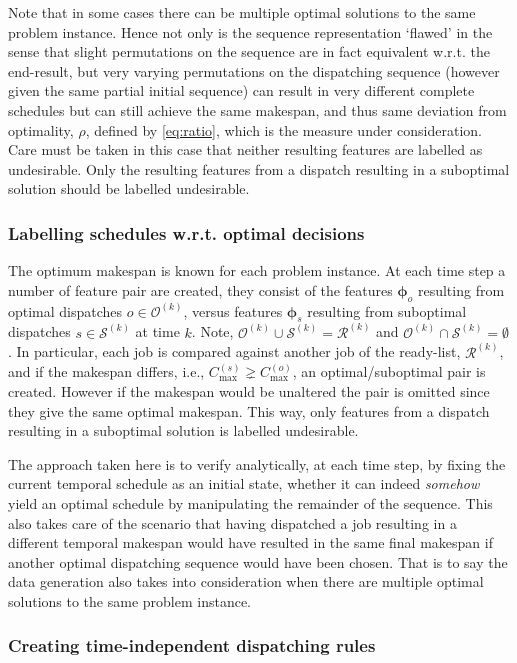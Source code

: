 \documentclass[smallextended]{svjour3}
\renewcommand{\vphi}{\bm \phi}
\begin{document}
	Note that in some cases there can be multiple optimal solutions to the same problem instance. Hence not only is the sequence representation `flawed' in the sense that slight permutations on the sequence are in fact equivalent w.r.t. the end-result, but very varying permutations on the dispatching sequence (however given the same partial initial sequence) can result in very different complete schedules but can still achieve the same makespan, and thus same deviation from optimality, $\rho$, defined by \cref{eq:ratio}, which is the measure under consideration. Care must be taken in this case that neither resulting features are labelled as undesirable. Only the resulting features from a dispatch resulting in a suboptimal solution should be labelled undesirable. 
	
	\subsubsection{Labelling schedules w.r.t. optimal decisions}\label{sec:labelling}
	The optimum makespan is known for each problem instance. 
	At each time step a number of feature pair are created, they consist of the features $\vphi_o$ resulting from optimal dispatches $o\in\mathcal{O}^{(k)}$, versus features $\vphi_s$ resulting from suboptimal dispatches $s\in\mathcal{S}^{(k)}$ at time $k$. Note, $\mathcal{O}^{(k)}\cup\mathcal{S}^{(k)}=\mathcal{R}^{(k)}$ and $\mathcal{O}^{(k)}\cap\mathcal{S}^{(k)}=\emptyset$.
	In particular, each job is compared against another job of the ready-list, $\mathcal{R}^{(k)}$, and if the makespan differs, i.e., $C_{\max}^{(s)}\gneq C_{\max}^{(o)}$, an optimal/suboptimal pair is created. However if the makespan would be unaltered the pair is omitted since they give the same optimal makespan. This way, only features from a dispatch resulting in a suboptimal solution is labelled undesirable.
	
	The approach taken here is to verify analytically, at each time step, by fixing the current temporal schedule as an initial state, whether it can indeed \emph{somehow} yield an optimal schedule by manipulating the remainder of the sequence. This also takes care of the scenario that having dispatched a job resulting in a different temporal makespan would have resulted in the same final makespan if another optimal dispatching sequence would have been chosen. That is to say the data generation also takes into consideration when there are multiple optimal solutions to the same problem instance. 
	
	\subsubsection{Creating time-independent dispatching rules}\label{sec:ord:timeindependent}
	
\end{document}
